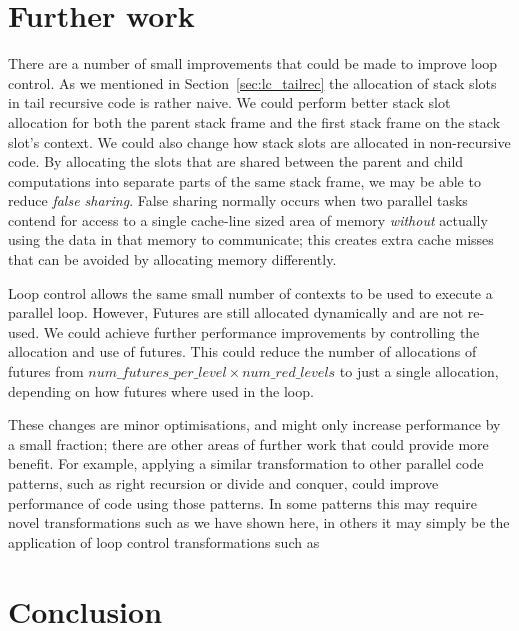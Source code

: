 \section{Further work}
\label{sec:lc_further_work}


There are a number of small improvements that could be made to improve loop
control.
As we mentioned in Section~\ref{sec:lc_tailrec} the allocation of stack
slots in tail recursive code is rather naive.
We could perform better stack slot allocation for both the parent stack
frame and the first stack frame on the stack slot's context.
We could also change how stack slots are allocated in non-recursive code.
By allocating the slots that are shared between the parent and child
computations into separate parts of the same stack frame,
we may be able to reduce \emph{false sharing}.
False sharing normally occurs when two parallel tasks contend for access to
a single cache-line sized area of memory \emph{without} actually using the
data in that memory to communicate;
this creates extra cache misses that can be avoided by allocating memory
differently.

Loop control allows the same small number of contexts to be used to execute
a parallel loop.
However, Futures are still allocated dynamically and are not re-used.
We could achieve further performance improvements by controlling the
allocation and use of futures.
This could reduce the number of allocations of futures from
$num\_futures\_per\_level \times num\_red\_levels$ to just a single
allocation,
depending on how futures where used in the loop.

These changes are minor optimisations, and might only increase
performance by a small fraction;
there are other areas of further work that could provide more benefit.
For example,
applying a similar transformation to other parallel code patterns,
such as right recursion or divide and conquer,
could improve performance of code using those patterns.
In some patterns this may require novel transformations such as we have
shown here,
in others it may simply be the application of loop control transformations
such as \citet{shen_98_granularity-control}


\section{Conclusion}
\label{sec:lc_conc}


